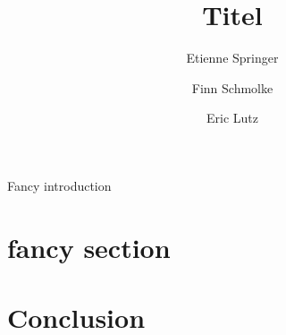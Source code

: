 \documentclass[
    aps,prl,floatfix,twocolumn,amsfonts,amssymb,amsmath
    ]{revtex4-2}
\begin{document}
\title{Titel}
\author{Etienne Springer}
\author{Finn Schmolke}
\author{Eric Lutz}


\begin{abstract}
    
\end{abstract}
Fancy introduction
\maketitle
\section{fancy section}

\section{Conclusion}

%
\end{document}
